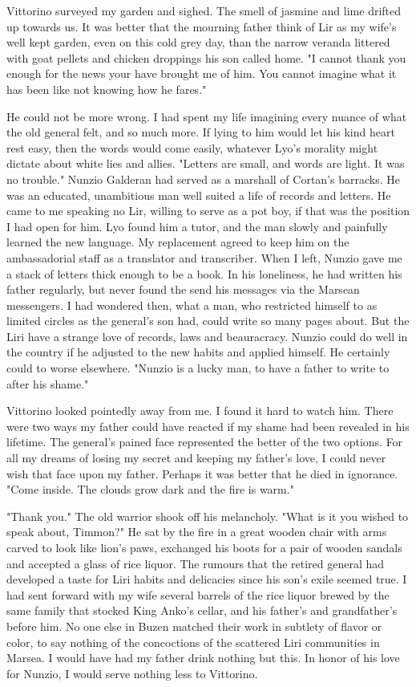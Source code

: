 \documentclass{article}
\begin{document}
Vittorino surveyed my garden and sighed. The smell of jasmine and lime drifted up towards us. It was better that the mourning father think of Lir as my wife's well kept garden, even on this cold grey day, than the narrow veranda littered with goat pellets and chicken droppings his son called home. "I cannot thank you enough for the news your have brought me of him. You cannot imagine what it has been like not knowing how he fares."

He could not be more wrong. I had spent my life imagining every nuance of what the old general felt, and so much more. If lying to him would let his kind heart rest easy, then the words would come easily, whatever Lyo's morality might dictate about white lies and allies. "Letters are small, and words are light. It was no trouble." Nunzio Galderan had served as a marshall of Cortan's barracks. He was an educated, unambitious man well suited a life of records and letters. He came to me speaking no Lir, willing to serve as a pot boy, if that was the position I had open for him. Lyo found him a tutor, and the man slowly and painfully learned the new language. My replacement agreed to keep him on the ambassadorial staff as a translator and transcriber. When I left, Nunzio gave me a stack of letters thick enough to be a book. In his loneliness, he had written his father regularly, but never found the send his messages via the Marsean messengers. I had wondered then, what a man, who restricted himself to as limited circles as the general's son had, could write so many pages about. But the Liri have a strange love of records, laws and beauracracy. Nunzio could do well in the country if he adjusted to the new habits and applied himself. He certainly could to worse elsewhere. "Nunzio is a lucky man, to have a father to write to after his shame."

Vittorino looked pointedly away from me. I found it hard to watch him. There were two ways my father could have reacted if my shame had been revealed in his lifetime. The general's pained face represented the better of the two options. For all my dreams of losing my secret and keeping my father's love, I could never wish that face upon my father. Perhaps it was better that he died in ignorance. "Come inside. The clouds grow dark and the fire is warm."

"Thank you." The old warrior shook off his melancholy. "What is it you wished to speak about, Timmon?" He sat by the fire in a great wooden chair with arms carved to look like lion's paws, exchanged his boots for a pair of wooden sandals and accepted a glass of rice liquor. The rumours that the retired general had developed a taste for Liri habits and delicacies since his son's exile seemed true. I had sent forward with my wife several barrels of the rice liquor brewed by the same family that stocked King Anko's cellar, and his father's and grandfather's before him. No one else in Buzen matched their work in subtlety of flavor or color, to say nothing of the concoctions of the scattered Liri communities in Marsea. I would have had my father drink nothing but this. In honor of his love for Nunzio, I would serve nothing less to Vittorino.
\end{document}
